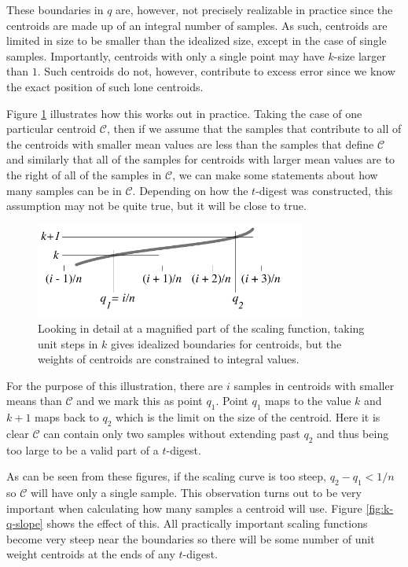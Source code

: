 \documentclass[11pt]{amsart}
\begin{document}
These boundaries in $q$ are, however, not precisely realizable in practice since the centroids are made up of an integral number of samples. As such, centroids are limited in size to be smaller than the idealized size, except in the case of single samples. Importantly, centroids with only a single point may have $k$-size larger than $1$. Such centroids do not, however, contribute to excess error since we know the exact position of such lone centroids.

Figure \ref{fig:k-q-limits} illustrates how this works out in practice. Taking the case of one particular centroid $\mathcal C$, then if we assume that the samples that contribute to all of the centroids with smaller mean values are less than the samples that define $\mathcal C$ and similarly that all of the samples for centroids with larger mean values are to the right of all of the samples in $\mathcal C$, we can make some statements about how many samples can be in $\mathcal C$. Depending on how the $t$-digest was constructed, this assumption may not be quite true, but it will be close to true.
\begin{figure}[htbp] %
   \centering
   \includegraphics[width=3.5in]{k-q-diagram/k-q-limits.pdf} 
   \caption{Looking in detail at a magnified part of the scaling function, taking unit steps in $k$ gives idealized boundaries for centroids, but the weights of centroids are  constrained to integral values. }
   \label{fig:k-q-limits}
\end{figure}
For the purpose of this illustration, there are $i$ samples in centroids with smaller means than $\mathcal C$ and we mark this as point $q_1$. Point $q_1$ maps to the value $k$ and $k+1$ maps back to $q_2$ which is the limit on the size of the centroid. Here it is clear $\mathcal C$ can contain only two samples without extending past $q_2$ and thus being too large to be a valid part of a $t$-digest.

As can be seen from these figures, if the scaling curve is too steep, $q_2-q_1 < 1/n$ so $\mathcal C$ will have only a single sample. This observation turns out to be very important when calculating how many samples a centroid will use. Figure \ref{fig:k-q-slope} shows the effect of this. All practically important scaling functions become very steep near the boundaries so there will be some number of unit weight centroids at the ends of any $t$-digest. 
\end{document}
